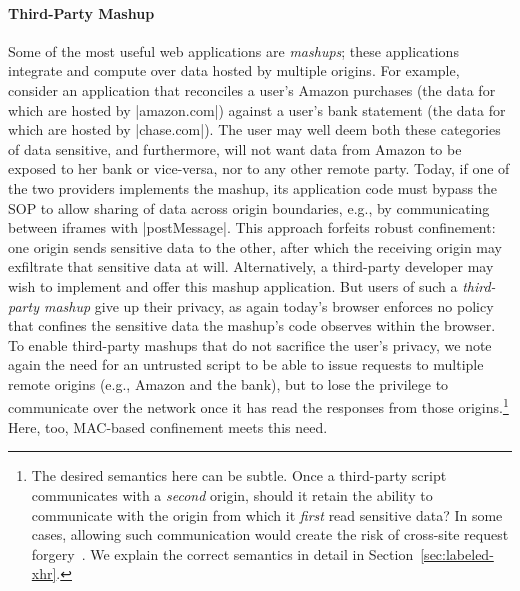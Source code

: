\paragraph{Third-Party Mashup}
Some of the most useful web applications are {\em mashups}; these
applications integrate and compute over data hosted by multiple
origins. For
example, consider an application that reconciles a user's Amazon
purchases (the data for which are hosted by \js|amazon.com|) against a
user's bank statement (the data for which are hosted by
\js|chase.com|). The user may well deem both these categories of data
sensitive, and furthermore, will not want data from Amazon to be
exposed to her bank or vice-versa, nor to any other remote
party. Today, if one of the two providers implements the mashup, its
application code must bypass the SOP to allow sharing of data across
origin boundaries, e.g., by communicating between iframes with
\js|postMessage|. This approach forfeits robust confinement: one
origin sends sensitive data to the other, after which the receiving
origin may exfiltrate that sensitive data at will. Alternatively, a
third-party developer may wish to implement and offer this mashup
application. But users of such a {\em third-party mashup} give up
their privacy, as again today's browser enforces no policy that
confines the sensitive data the mashup's code observes within the
browser. To enable third-party mashups that do not sacrifice the
user's privacy, we note again the need for an untrusted script to be
able to issue requests to multiple remote origins (e.g., Amazon and
the bank), but to lose the privilege to communicate over the network
once it has read the responses from those origins.\footnote{The
  desired semantics here can be subtle. Once a third-party script
  communicates with a \emph{second} origin, should it retain the
  ability to communicate with the origin from which it \emph{first}
  read sensitive data? In some cases, allowing such communication
  would create the risk of cross-site request
  forgery~. We explain the correct semantics in detail in
  Section~\ref{sec:labeled-xhr}.} Here, too, MAC-based confinement
  meets this need.

